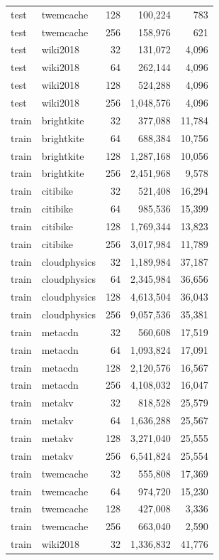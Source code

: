 \begin{longtable}{llrrr}
test & twemcache & 128 & 100,224 & 783 \\
test & twemcache & 256 & 158,976 & 621 \\
test & wiki2018 & 32 & 131,072 & 4,096 \\
test & wiki2018 & 64 & 262,144 & 4,096 \\
test & wiki2018 & 128 & 524,288 & 4,096 \\
test & wiki2018 & 256 & 1,048,576 & 4,096 \\
train & brightkite & 32 & 377,088 & 11,784 \\
train & brightkite & 64 & 688,384 & 10,756 \\
train & brightkite & 128 & 1,287,168 & 10,056 \\
train & brightkite & 256 & 2,451,968 & 9,578 \\
train & citibike & 32 & 521,408 & 16,294 \\
train & citibike & 64 & 985,536 & 15,399 \\
train & citibike & 128 & 1,769,344 & 13,823 \\
train & citibike & 256 & 3,017,984 & 11,789 \\
train & cloudphysics & 32 & 1,189,984 & 37,187 \\
train & cloudphysics & 64 & 2,345,984 & 36,656 \\
train & cloudphysics & 128 & 4,613,504 & 36,043 \\
train & cloudphysics & 256 & 9,057,536 & 35,381 \\
train & metacdn & 32 & 560,608 & 17,519 \\
train & metacdn & 64 & 1,093,824 & 17,091 \\
train & metacdn & 128 & 2,120,576 & 16,567 \\
train & metacdn & 256 & 4,108,032 & 16,047 \\
train & metakv & 32 & 818,528 & 25,579 \\
train & metakv & 64 & 1,636,288 & 25,567 \\
train & metakv & 128 & 3,271,040 & 25,555 \\
train & metakv & 256 & 6,541,824 & 25,554 \\
train & twemcache & 32 & 555,808 & 17,369 \\
train & twemcache & 64 & 974,720 & 15,230 \\
train & twemcache & 128 & 427,008 & 3,336 \\
train & twemcache & 256 & 663,040 & 2,590 \\
train & wiki2018 & 32 & 1,336,832 & 41,776 \\

\end{longtable}

